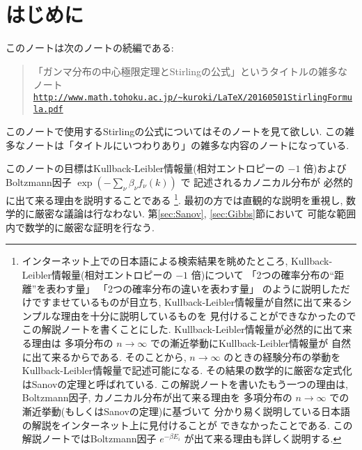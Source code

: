 \documentclass[12pt,twoside]{jarticle}
\theoremstyle{jplain}
\theoremstyle{jplain}
\theoremstyle{jplain}
\numberwithin{theorem}{section}
\numberwithin{equation}{section}
\numberwithin{figure}{section}
\numberwithin{table}{section}
\begin{document}
\title{\TITLE}
\author{\AUTHOR}
\date{\DATE}
\maketitle
\tableofcontents
\setcounter{section}{-1} %

\section{はじめに}

このノートは次のノートの続編である:
\begin{quote}
「ガンマ分布の中心極限定理とStirlingの公式」というタイトルの雑多なノート
\\
\href{http://www.math.tohoku.ac.jp/~kuroki/LaTeX/20160501StirlingFormula.pdf}
{\tt http://www.math.tohoku.ac.jp/{\textasciitilde}kuroki/LaTeX/20160501StirlingFormula.pdf}
\end{quote}
このノートで使用するStirlingの公式についてはそのノートを見て欲しい.
この雑多なノートは「タイトルにいつわりあり」の雑多な内容のノートになっている.

このノートの目標はKullback-Leibler情報量(相対エントロピーの $-1$ 倍)および
Boltzmann因子 $\exp(-\sum_\nu \beta_\nu f_{\nu}(k))$ で
記述されるカノニカル分布が
必然的に出て来る理由を説明することである%
\footnote{インターネット上での日本語による検索結果を眺めたところ, 
Kullback-Leibler情報量(相対エントロピーの $-1$ 倍)について
「2つの確率分布の``距離''を表わす量」
「2つの確率分布の違いを表わす量」
のように説明しただけですませているものが目立ち, 
Kullback-Leibler情報量が自然に出て来るシンプルな理由を十分に説明しているものを
見付けることができなかったのでこの解説ノートを書くことにした.
Kullback-Leibler情報量が必然的に出て来る理由は
多項分布の $n\to\infty$ での漸近挙動にKullback-Leibler情報量が
自然に出て来るからである.
そのことから, $n\to\infty$ のときの経験分布の挙動を
Kullback-Leibler情報量で記述可能になる.
その結果の数学的に厳密な定式化はSanovの定理と呼ばれている.
この解説ノートを書いたもう一つの理由は, 
Boltzmann因子, カノニカル分布が出て来る理由を
多項分布の $n\to\infty$ での漸近挙動(もしくはSanovの定理)に基づいて
分かり易く説明している日本語の解説をインターネット上に見付けることが
できなかったことである. 
この解説ノートではBoltzmann因子 $e^{-\beta E_i}$ が出て来る理由も詳しく説明する.}.
最初の方では直観的な説明を重視し, 数学的に厳密な議論は行なわない.
第\ref{sec:Sanov}, \ref{sec:Gibbs}節において
可能な範囲内で数学的に厳密な証明を行なう.
\end{document}
